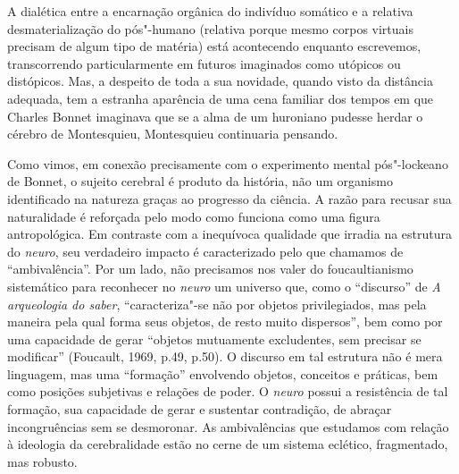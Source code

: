 A dialética entre a encarnação orgânica do indivíduo somático e a
relativa desmaterialização do pós"-humano (relativa porque mesmo corpos
virtuais precisam de algum tipo de matéria) está acontecendo enquanto
escrevemos, transcorrendo particularmente em futuros imaginados como
utópicos ou distópicos. Mas, a despeito de toda a sua novidade, quando
visto da distância adequada, tem a estranha aparência de uma cena
familiar dos tempos em que Charles Bonnet imaginava que se a alma de um
huroniano pudesse herdar o cérebro de Montesquieu, Montesquieu
continuaria pensando.

Como vimos, em conexão precisamente com o experimento mental
pós"-lockeano de Bonnet, o sujeito cerebral é produto da história, não um
organismo identificado na natureza graças ao progresso da ciência. A
razão para recusar sua naturalidade é reforçada pelo modo como funciona
como uma figura antropológica. Em contraste com a inequívoca qualidade
que irradia na estrutura do \emph{neuro}, seu verdadeiro impacto é
caracterizado pelo que chamamos de ``ambivalência''. Por um lado, não
precisamos nos valer do foucaultianismo sistemático para reconhecer no
\emph{neuro} um universo que, como o ``discurso'' de \emph{A arqueologia
do saber}, ``caracteriza"-se não por objetos privilegiados, mas pela
maneira pela qual forma seus objetos, de resto muito dispersos'', bem
como por uma capacidade de gerar ``objetos mutuamente excludentes, sem
precisar se modificar'' (Foucault, 1969, p.49, p.50). O discurso em tal
estrutura não é mera linguagem, mas uma ``formação'' envolvendo objetos,
conceitos e práticas, bem como posições subjetivas e relações de poder.
O \emph{neuro} possui a resistência de tal formação, sua capacidade de
gerar e sustentar contradição, de abraçar incongruências sem se
desmoronar. As ambivalências que estudamos com relação à ideologia da
cerebralidade estão no cerne de um sistema eclético, fragmentado, mas
robusto.

